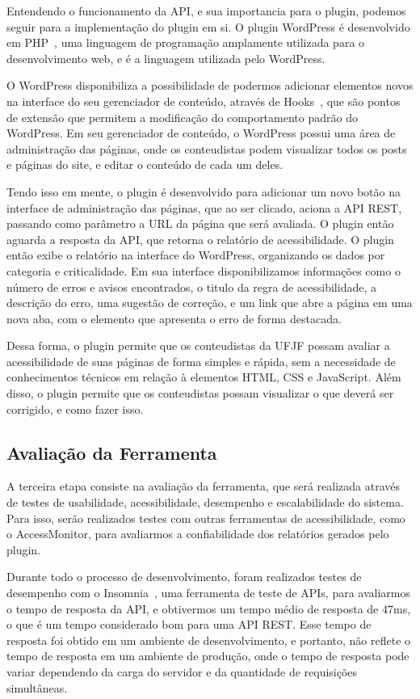 \documentclass[
	article,			%
	12pt,				%
	oneside,			%
	a4paper,			%
	section=TITLE,		%
	subsection=TITLE,	%
	english,			%
	brazil,				%
	sumario=tradicional
	]{abntex2}
\begin{document}
Entendendo o funcionamento da API, e sua importancia para o
plugin, podemos seguir para a implementação do plugin em si. O plugin WordPress
é desenvolvido em PHP~\cite{php}, uma linguagem de programação amplamente utilizada
para o desenvolvimento web, e é a linguagem utilizada pelo WordPress.

O WordPress disponibiliza a possibilidade de podermos adicionar elementos novos na interface
do seu gerenciador de conteúdo, através de Hooks~\cite{hooks}, que são pontos
de extensão que permitem a modificação do comportamento padrão do WordPress. Em seu
gerenciador de conteúdo, o WordPress possui uma área de administração das páginas, onde
os conteudistas podem visualizar todos os posts e páginas do site, e editar o conteúdo
de cada um deles.

Tendo isso em mente, o plugin é desenvolvido para adicionar um novo botão na
interface de administração das páginas, que ao ser clicado, aciona a API REST,
passando como parâmetro a URL da página que será avaliada. O plugin então
aguarda a resposta da API, que retorna o relatório de acessibilidade. O plugin
então exibe o relatório na interface do WordPress, organizando os dados
por categoria e criticalidade. Em sua interface disponibilizamos informações
como o número de erros e avisos encontrados,
o titulo da regra de acessibilidade, a descrição do erro, uma sugestão de correção,
e um link que abre a página em uma nova aba, com o elemento que apresenta o erro de
forma destacada.

Dessa forma, o plugin permite que os conteudistas da UFJF possam avaliar a
acessibilidade de suas páginas de forma simples e rápida, sem a necessidade
de conhecimentos técnicos em relação à elementos HTML, CSS e JavaScript.
Além disso, o plugin permite que os conteudistas possam visualizar o que
deverá ser corrigido, e como fazer isso.

\subsection{Avaliação da Ferramenta}
A terceira etapa consiste na avaliação da ferramenta, que será realizada
através de testes de usabilidade, acessibilidade, desempenho e escalabilidade
do sistema. Para isso, serão realizados testes com outras ferramentas de
acessibilidade, como o AccessMonitor, para avaliarmos a
confiabilidade dos relatórios gerados pelo plugin.

Durante todo o processo
de desenvolvimento, foram realizados testes de desempenho com o Insomnia~\cite{insomnia},
uma ferramenta de teste de APIs, para avaliarmos o tempo de resposta da API,
e obtivermos um tempo médio de resposta de 47ms, o que é um tempo considerado
bom para uma API REST. Esse tempo de resposta foi obtido em um ambiente
de desenvolvimento, e portanto, não reflete o tempo de resposta em um
ambiente de produção, onde o tempo de resposta pode variar dependendo da
carga do servidor e da quantidade de requisições simultâneas.
\end{document}
